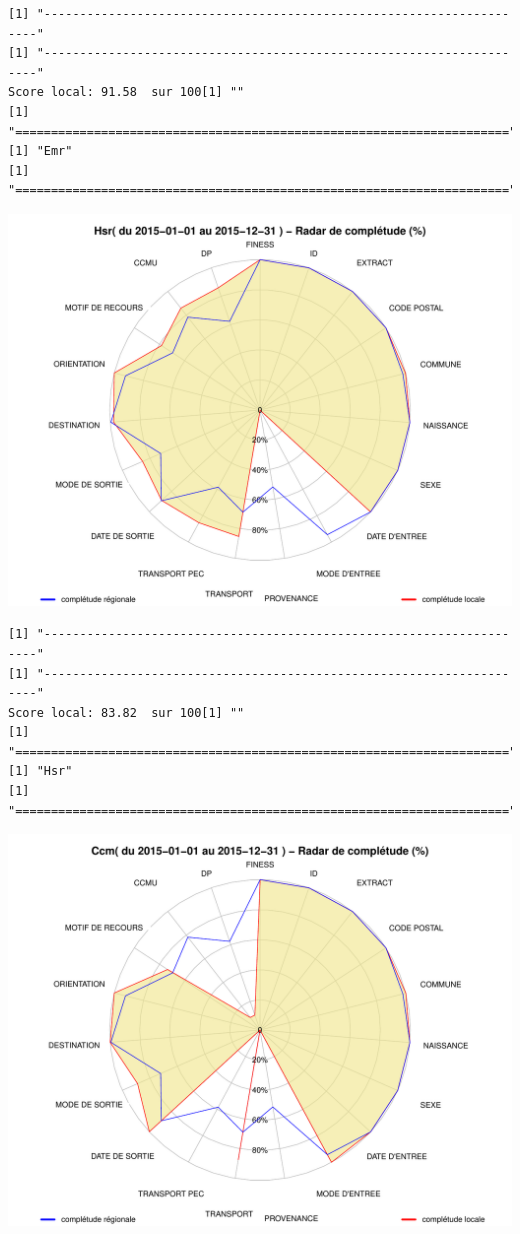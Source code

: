 \documentclass[]{article}
\begin{document}
\begin{verbatim}
[1] "---------------------------------------------------------------------"
[1] "---------------------------------------------------------------------"
Score local: 91.58  sur 100[1] ""
[1] "====================================================================="
[1] "Emr"
[1] "====================================================================="
\end{verbatim}

\includegraphics{completude_files/figure-latex/finess-18.pdf}

\begin{verbatim}
[1] "---------------------------------------------------------------------"
[1] "---------------------------------------------------------------------"
Score local: 83.82  sur 100[1] ""
[1] "====================================================================="
[1] "Hsr"
[1] "====================================================================="
\end{verbatim}

\includegraphics{completude_files/figure-latex/finess-19.pdf}
\end{document}
